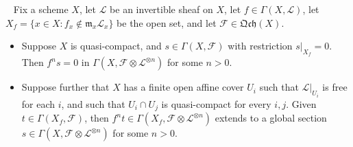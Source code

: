 \documentclass[11pt,a4paper,footinclude=true,headinclude=true]{scrbook} %
\newcommand{\FF}{\mathscr{F}}
\newcommand{\LL}{\mathscr{L}}
\newcommand{\mm}{\mathfrak{m}}
\newcommand{\<}{\langle}
\newcommand{\>}{\rangle}
\newcommand{\qcoh}{\mathfrak{Qch}}
\newenvironment{lemma}[2][]
{\renewcommand\theinnercustomlemma{#2}\innercustomlemma[#1]
\begin{mdframed}[backgroundcolor=gray!20]\ }
{\end{mdframed}\endinnercustomprop}
\begin{document}
\begin{lemma}{5.14}
    Fix a scheme $X$, let $\LL$ be an invertible sheaf on $X$, let $f\in\Gamma(X,\LL)$, let $X_f=\{x\in X:f_x\notin\mm_x\LL_x\}$ be the open set, and let $\FF\in\qcoh(X)$.
    \begin{itemize}
        \item[(a)] Suppose $X$ is quasi-compact, and $s\in\Gamma(X,\FF)$ with restriction $s|_{X_f}=0$. Then $f^ns=0$ in $\Gamma(X,\FF\otimes\LL^{\otimes n})$ for some $n>0$.
        \item[(b)] Suppose further that $X$ has a finite open affine cover $U_i$ such that $\LL|_{U_i}$ is free for each $i$, and such that $U_i\cap U_j$ is quasi-compact for every $i,j$. Given $t\in\Gamma(X_f,\FF)$, then $f^nt\in\Gamma(X_f,\FF\otimes\LL^{\otimes n})$ extends to a global section $s\in\Gamma(X,\FF\otimes\LL^{\otimes n})$ for some $n>0$.
    \end{itemize}
\end{lemma}
\end{document}
